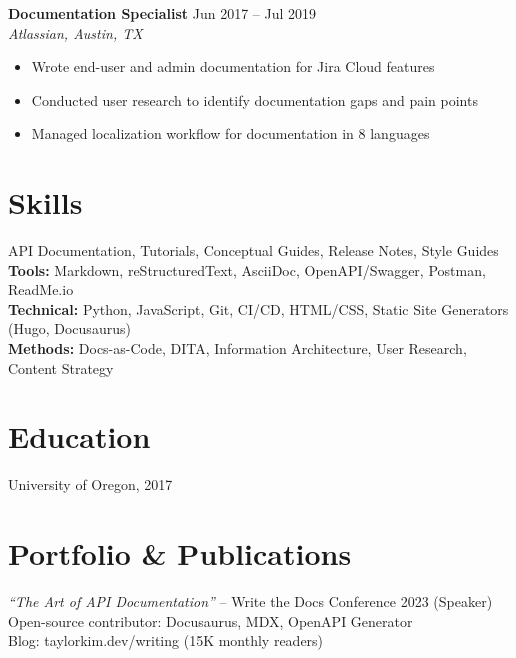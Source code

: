 \documentclass[11pt,a4paper]{article}
\begin{document}
{\fontsize{12}{14}\selectfont\bfseries Documentation Specialist} \hfill {\color{gray60}\small Jun 2017 -- Jul 2019}\\
{\color{gray60}\textit{Atlassian, Austin, TX}}
\begin{itemize}[leftmargin=1.2em,nosep,label={\color{gray60}\textbullet}]
\item Wrote end-user and admin documentation for Jira Cloud features
\item Conducted user research to identify documentation gaps and pain points
\item Managed localization workflow for documentation in 8 languages
\end{itemize}

\section{Skills}

 API Documentation, Tutorials, Conceptual Guides, Release Notes, Style Guides\\[0.3em]
{\bfseries Tools:} Markdown, reStructuredText, AsciiDoc, OpenAPI/Swagger, Postman, ReadMe.io\\[0.3em]
{\bfseries Technical:} Python, JavaScript, Git, CI/CD, HTML/CSS, Static Site Generators (Hugo, Docusaurus)\\[0.3em]
{\bfseries Methods:} Docs-as-Code, DITA, Information Architecture, User Research, Content Strategy

\section{Education}

 \hfill University of Oregon, 2017

\section{Portfolio \& Publications}
\noindent\textit{``The Art of API Documentation''} -- Write the Docs Conference 2023 (Speaker)\\
Open-source contributor: Docusaurus, MDX, OpenAPI Generator\\
Blog: taylorkim.dev/writing (15K monthly readers)
\end{document}
